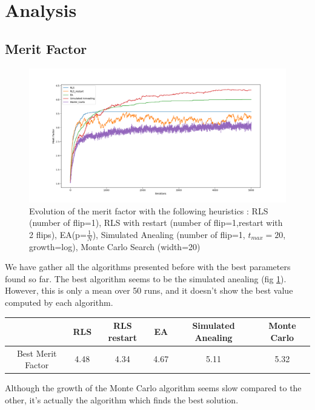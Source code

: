 \documentclass[a4paper,11pt,openany]{article}
\begin{document}
\section{Analysis}
\subsection{Merit Factor}
\begin{figure}[H]
\begin{center}
\includegraphics[scale=0.35]{Images/all_results}
\caption{Evolution of the merit factor with the following heuristics : RLS (number of flip=1), RLS with restart (number of flip=1,restart with 2 flips), EA(p=$\frac{1}{N}$), Simulated Anealing (number of flip=1, $t_{max}=20$, growth=log), Monte Carlo Search (width=20)}
\label{fig:all_results}
\end{center}
\end{figure}
\noindent
We have gather all the algorithms presented before with the best parameters found so far. The best algorithm seems to be the simulated anealing (fig \ref{fig:all_results}). However, this is only a mean over 50 runs, and it doesn't show the best value computed by each algorithm.\\
\begin{center}
\begin{tabular}{|c|c|c|c|c|c|}
\hline
  & RLS & RLS restart & EA & Simulated Anealing & Monte Carlo \\
\hline
Best Merit Factor & 4.48 & 4.34 & 4.67 & 5.11 & 5.32\\
\hline
\end{tabular}
\end{center}
Although the growth of the Monte Carlo algorithm seems slow compared to the other, it's actually the algorithm which finds the best solution.
\end{document}
